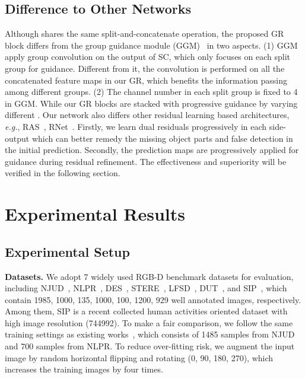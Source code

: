 \documentclass[runningheads]{llncs}
\begin{document}
\subsection{Difference to Other Networks}
Although shares the same split-and-concatenate operation, the proposed GR block differs from the group guidance module (GGM)~\cite{liu2019deep} in two aspects. (1) GGM apply group convolution on the output of SC, which only focuses on each split group for guidance. Different from it, the convolution is performed on all the concatenated feature maps in our GR, which benefits the information passing among different groups. (2) The channel number in each split group is fixed to 4 in GGM. While our GR blocks are stacked with progressive guidance by varying different . Our network also differs other residual learning based architectures, \textit{e.g.}, RAS~\cite{chen2018reverse}\cite{chen2020tip}, RNet~\cite{deng2018r3net}. Firstly, we learn dual residuals progressively in each side-output which can better remedy the missing object parts and false detection in the initial prediction. Secondly, the prediction maps are progressively applied for guidance during residual refinement. The effectiveness and superiority will be verified in the following section.

\section{Experimental Results}
\subsection{Experimental Setup}
\textbf{Datasets.}
We adopt 7 widely used RGB-D benchmark datasets for evaluation, including NJUD~\cite{ju2014depth}, NLPR~\cite{peng2014rgbd}, DES~\cite{cheng2014depth}, STERE~\cite{niu2012leveraging}, LFSD~\cite{li2014saliency},  DUT~\cite{piao2019depth}, and SIP~\cite{fan2019rethinking}, which contain 1985, 1000, 135, 1000, 100, 1200, 929 well annotated images, respectively. Among them, SIP is a recent collected human activities oriented dataset with high image resolution (744992). To make a fair comparison, we follow the same training settings as existing works~\cite{han2017cnns}\cite{chen2018progressively}\cite{chen2019three}\cite{fan2019rethinking}, which consists of 1485 samples from NJUD and 700 samples from NLPR. To reduce over-fitting risk, we augment the input image by random horizontal flipping and rotating (0\degree, 90\degree, 180\degree, 270\degree), which increases the training images by four times.
\end{document}
